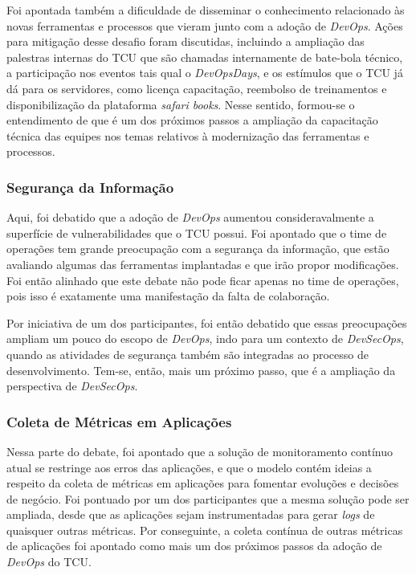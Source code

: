 Foi apontada também a dificuldade de disseminar o conhecimento relacionado
às novas ferramentas e processos que vieram junto com a adoção de {\it DevOps}.
Ações para mitigação desse desafio foram discutidas, incluindo a ampliação das
palestras internas do \acrshort{TCU} que são chamadas internamente de bate-bola
técnico, a participação nos eventos tais qual o \emph{DevOpsDays}, e os estímulos
que o \acrshort{TCU} já dá para os servidores, como licença capacitação,
reembolso de treinamentos e disponibilização da plataforma {\it safari books}.
Nesse sentido, formou-se o entendimento de que é um dos próximos passos a
ampliação da capacitação técnica das equipes nos temas relativos à modernização
das ferramentas e processos.

\subsubsection{Segurança da Informação}

Aqui, foi debatido que a adoção de {\it DevOps} aumentou consideravalmente a
superfície de vulnerabilidades que o \acrshort{TCU} possui. Foi apontado que
o time de operações tem grande preocupação com a segurança da informação, que
estão avaliando algumas das ferramentas implantadas e que irão propor
modificações. Foi então alinhado que este debate não pode ficar apenas no time
de operações, pois isso é exatamente uma manifestação da falta de colaboração.

Por iniciativa de um dos participantes, foi então debatido que essas preocupações
ampliam um pouco do escopo de {\it DevOps}, indo para um contexto de {\it DevSecOps},
quando as atividades de segurança também são integradas ao processo de
desenvolvimento. Tem-se, então, mais um próximo passo, que é a ampliação da
perspectiva de {\it DevSecOps}.

\subsubsection{Coleta de Métricas em Aplicações}

Nessa parte do debate, foi apontado que a solução de monitoramento contínuo
atual se restringe aos erros das aplicações, e que o modelo contém ideias a
respeito da coleta de métricas em aplicações para fomentar evoluções e decisões
de negócio. Foi pontuado por um dos participantes que a mesma solução pode ser
ampliada, desde que as aplicações sejam instrumentadas para gerar {\it logs} de
quaisquer outras métricas. Por conseguinte, a coleta contínua de outras métricas
de aplicações foi apontado como mais um dos próximos passos da adoção de
{\it DevOps} do \acrshort{TCU}.

